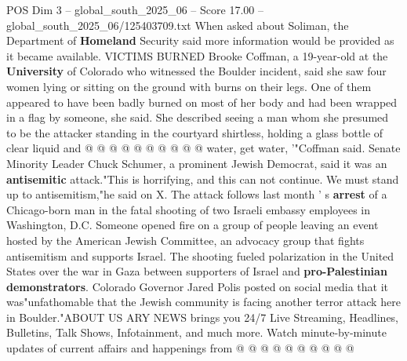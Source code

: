 \begin{textsample}{POS Dim 3 – global\_south\_2025\_06 – Score 17.00 – global\_south\_2025\_06/125403709.txt}
When asked about Soliman, the Department of \textbf{Homeland} Security said more information would be provided as it became available.
VICTIMS BURNED Brooke Coffman, a 19-year-old at the \textbf{University} of Colorado who witnessed the Boulder incident, said she saw four women lying or sitting on the ground with burns on their legs.
One of them appeared to have been badly burned on most of her body and had been wrapped in a flag by someone, she said.
She described seeing a man whom she presumed to be the attacker standing in the courtyard shirtless, holding a glass bottle of clear liquid and @ @ @ @ @ @ @ @ @ @ water, get water, '"Coffman said.
Senate Minority Leader Chuck Schumer, a prominent Jewish Democrat, said it was an \textbf{antisemitic} attack."This is horrifying, and this can not continue.
We must stand up to antisemitism,"he said on X.
The attack follows last month ' s \textbf{arrest} of a Chicago-born man in the fatal shooting of two Israeli embassy employees in Washington, D.C.
Someone opened fire on a group of people leaving an event hosted by the American Jewish Committee, an advocacy group that fights antisemitism and supports Israel.
The shooting fueled polarization in the United States over the war in Gaza between supporters of Israel and \textbf{pro-Palestinian} \textbf{demonstrators}.
Colorado Governor Jared Polis posted on social media that it was"unfathomable that the Jewish community is facing another terror attack here in Boulder."ABOUT US ARY NEWS brings you 24/7 Live Streaming, Headlines, Bulletins, Talk Shows, Infotainment, and much more.
Watch minute-by-minute updates of current affairs and happenings from @ @ @ @ @ @ @ @ @ @

\end{textsample}
